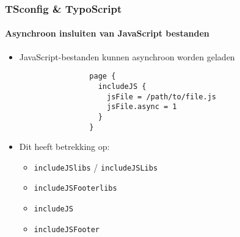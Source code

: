 
\begin{frame}[fragile]
	\frametitle{TSconfig \& TypoScript}
	\framesubtitle{Asynchroon insluiten van JavaScript bestanden}

	\begin{itemize}
		\item JavaScript-bestanden kunnen asynchroon worden geladen

			\begin{lstlisting}
				page {
				  includeJS {
				    jsFile = /path/to/file.js
				    jsFile.async = 1
				  }
				}
			\end{lstlisting}

		\item Dit heeft betrekking op:

			\begin{itemize}
				\item \texttt{includeJSlibs} / \texttt{includeJSLibs}
				\item \texttt{includeJSFooterlibs}
				\item \texttt{includeJS}
				\item \texttt{includeJSFooter}
			\end{itemize}

	\end{itemize}

\end{frame}


